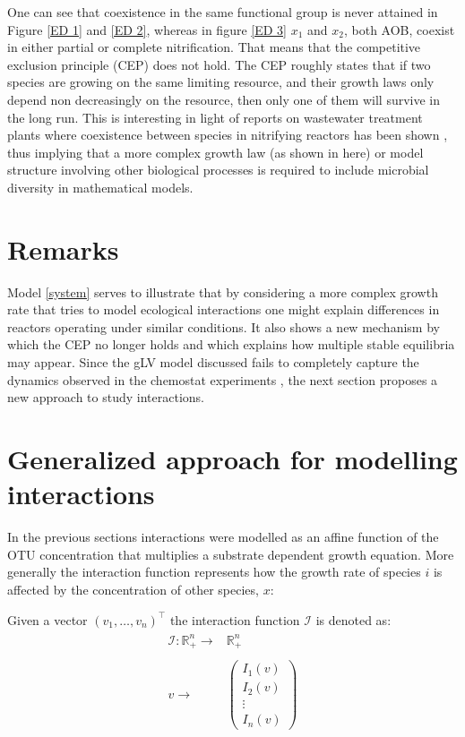 \documentclass[3p,times]{article}
\newcommand{\R}{\mathbb{R}}
\newcommand{\I}{\mathcal{I}}
\begin{document}
One can see that coexistence in the same functional group is never attained in Figure \ref{ED 1} and \ref{ED 2}, whereas in figure \ref{ED 3} $x_1$ and $x_2$, both AOB, coexist in either partial or complete nitrification. That means that the competitive exclusion principle \cite{lobry2017chemostat} (CEP) does not hold. The CEP roughly states that if two species are growing on the same limiting resource, and their growth laws only depend non decreasingly on the resource, then only one of them will survive in the long run. This is interesting in light of reports on wastewater treatment plants where coexistence between species in nitrifying reactors has been shown \cite{Wagner2002}, thus implying that a more complex growth law (as shown in here) or model structure involving other biological processes is required to include microbial diversity in mathematical models. 

\section*{Remarks}

Model \eqref{system} serves to illustrate that by considering a more complex growth rate that tries to model ecological interactions one might explain differences in reactors operating under similar conditions. It also shows a new mechanism by which the CEP no longer holds and which explains how multiple stable equilibria may appear. Since the gLV model discussed fails to completely capture the dynamics observed in the chemostat experiments \cite{Dumont2016}, the next section proposes a new approach to study interactions.


\section{Generalized approach for modelling interactions}
In the previous sections interactions were modelled as an affine function of the OTU concentration that multiplies a substrate dependent growth equation. More generally the interaction function represents how the growth rate of species $i$ is affected by the concentration of other species, $x$: 

Given a vector $(v_1,\dots,v_n)^\top$ the interaction function $\I$ is denoted as:
\begin{align}
\begin{array}{rc}
\I: \R_+^n \rightarrow & \R_+^n\\
& \\
v \rightarrow & \begin{pmatrix}
I_1(v) \\
I_2(v) \\ 
\vdots  \\
I_n(v)
\end{pmatrix}
\end{array}
\end{align}
\end{document}
